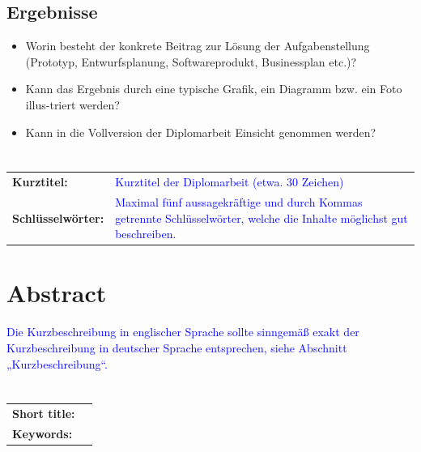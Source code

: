 \documentclass[12pt, twoside]{article}
\begin{document}
\subsection*{Ergebnisse}
\begin{itemize}
    \item Worin besteht der konkrete Beitrag zur Lösung der Aufgabenstellung (Prototyp, Entwurfsplanung, Softwareprodukt, Businessplan etc.)?
    \item Kann das Ergebnis durch eine typische Grafik, ein Diagramm bzw. ein Foto illus-triert werden?
    \item Kann in die Vollversion der Diplomarbeit Einsicht genommen werden?
\end{itemize}

\color{black}
\vspace*{\fill}
\section*{}

\bgroup
    \def\arraystretch{1.5}
    \begin{tabular}{p{48mm}p{113mm}}
        \textbf{Kurztitel:} & \textcolor{blue}{Kurztitel der Diplomarbeit (etwa. 30 Zeichen)}\\
        \textbf{Schlüsselwörter:} & \textcolor{blue}{Maximal fünf aussagekräftige und durch Kommas getrennte Schlüsselwörter, welche die Inhalte möglichst gut beschreiben.}
    \end{tabular}
\egroup

\newpage

\section*{Abstract}
\textcolor{blue}{Die Kurzbeschreibung in englischer Sprache sollte sinngemäß exakt der Kurzbeschreibung in deutscher Sprache entsprechen, siehe Abschnitt „Kurzbeschreibung“.}

\vspace*{\fill}
\section*{}

\bgroup{}
    \def\arraystretch{1.5}
    \begin{tabular}{p{48mm}p{113mm}}
        \textbf{Short title:} & \\
        \textbf{Keywords:} & 
    \end{tabular}
\egroup{}
\end{document}
